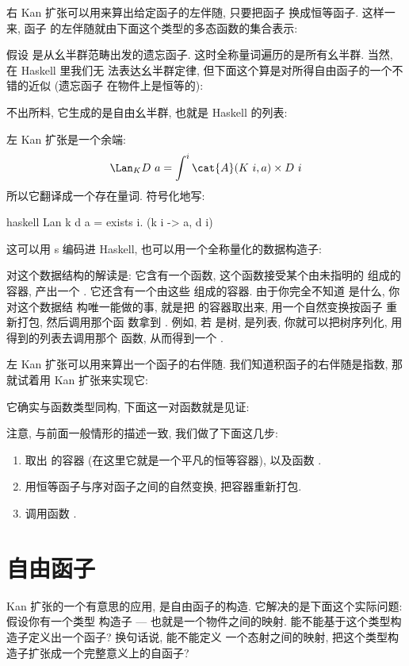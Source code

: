 右 Kan 扩张可以用来算出给定函子的左伴随, 只要把函子  换成恒等函子. 这样一来, 函子 
的左伴随就由下面这个类型的多态函数的集合表示:

假设  是从幺半群范畴出发的遗忘函子. 这时全称量词遍历的是所有幺半群. 当然, 在 Haskell 里我们无
法表达幺半群定律, 但下面这个算是对所得自由函子的一个不错的近似 (遗忘函子  在物件上是恒等的):

不出所料, 它生成的是自由幺半群, 也就是 Haskell 的列表:

左 Kan 扩张是一个余端:
\[\Lan_{K}D\ a = \int^i \cat{A}(K\ i, a)\times{}D\ i\]
所以它翻译成一个存在量词. 符号化地写:

\begin{snip}{haskell}
Lan k d a = exists i. (k i -> a, d i)
\end{snip}
这可以用 s 编码进 Haskell, 也可以用一个全称量化的数据构造子:

对这个数据结构的解读是: 它含有一个函数, 这个函数接受某个由未指明的  组成的容器, 产出一个
. 它还含有一个由这些  组成的容器. 由于你完全不知道  是什么, 你对这个数据结
构唯一能做的事, 就是把  的容器取出来, 用一个自然变换按函子  重新打包, 然后调用那个函
数拿到 . 例如, 若  是树,  是列表, 你就可以把树序列化, 用得到的列表去调用那个
函数, 从而得到一个 .

左 Kan 扩张可以用来算出一个函子的右伴随. 我们知道积函子的右伴随是指数, 那就试着用 Kan 扩张来实现它:

它确实与函数类型同构, 下面这一对函数就是见证:

注意, 与前面一般情形的描述一致, 我们做了下面这几步:

\begin{enumerate}
  \tightlist
  \item
        取出  的容器 (在这里它就是一个平凡的恒等容器), 以及函数 .
  \item
        用恒等函子与序对函子之间的自然变换, 把容器重新打包.
  \item
        调用函数 .
\end{enumerate}

\section{自由函子}

Kan 扩张的一个有意思的应用, 是自由函子的构造. 它解决的是下面这个实际问题: 假设你有一个类型
构造子 --- 也就是一个物件之间的映射. 能不能基于这个类型构造子定义出一个函子? 换句话说, 能不能定义
一个态射之间的映射, 把这个类型构造子扩张成一个完整意义上的自函子?

